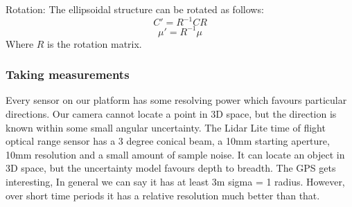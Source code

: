 \documentclass[a4paper, 11pt, titlepage]{article}
\begin{document}
      Rotation:
      The ellipsoidal structure can be rotated as follows:
      \begin{equation}
      C' = R^{-1} C R
      \end{equation}
      \begin{equation}
      \mu' = R^{-1} \mu
      \end{equation}
      Where \(R\) is the rotation matrix.

    \subsubsection{Taking measurements}
      Every sensor on our platform has some resolving power which favours particular directions.
      Our camera cannot locate a point in 3D space, but the direction is known within some small angular uncertainty.
      The Lidar Lite time of flight optical range sensor has a 3 degree conical beam, a 10mm starting aperture, 10mm resolution and a small amount of sample noise. It can locate an object in 3D space, but the uncertainty model favours depth to breadth.
      The GPS gets interesting, In general we can say it has at least 3m sigma = 1 radius. However, over short time periods it has a relative resolution much better than that.
\end{document}

